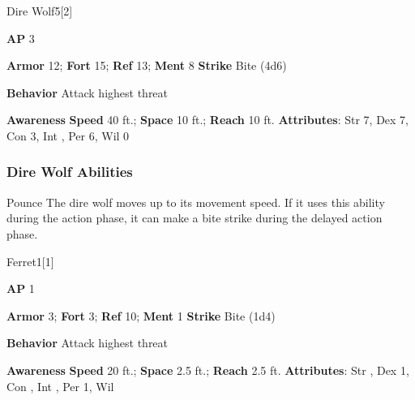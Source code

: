 \begin{monsection}{Dire Wolf}{5}[2]
\vspace{-1em}\vspace{-1em}
\begin{spellcontent}
\begin{spelltargetinginfo}
{\textbf{AP} 3}

\pari \textbf{Armor} 12;
\textbf{Fort} 15;
\textbf{Ref} 13;
\textbf{Ment} 8
\pari \textbf{Strike} Bite  (4d6)



\pari \textbf{Behavior} Attack highest threat
\end{spelltargetinginfo}
\end{spellcontent}

\begin{monsterfooter}
\pari \textbf{Awareness} 
\pari \textbf{Speed} 40 ft.;
\textbf{Space} 10 ft.;
\textbf{Reach} 10 ft.
\pari \textbf{Attributes}:
Str 7,
Dex 7,
Con 3,
Int ,
Per 6,
Wil 0
\end{monsterfooter}
\end{monsection}


\subsubsection{Dire Wolf Abilities}

\begin{ability}{Pounce}
The dire wolf moves up to its movement speed.
If it uses this ability during the action phase, it can make a bite strike during the delayed action phase.
\end{ability}

\begin{monsection}{Ferret}{1}[1]
\vspace{-1em}\vspace{-1em}
\begin{spellcontent}
\begin{spelltargetinginfo}
{\textbf{AP} 1}

\pari \textbf{Armor} 3;
\textbf{Fort} 3;
\textbf{Ref} 10;
\textbf{Ment} 1
\pari \textbf{Strike} Bite  (1d4)



\pari \textbf{Behavior} Attack highest threat
\end{spelltargetinginfo}
\end{spellcontent}

\begin{monsterfooter}
\pari \textbf{Awareness} 
\pari \textbf{Speed} 20 ft.;
\textbf{Space} 2.5 ft.;
\textbf{Reach} 2.5 ft.
\pari \textbf{Attributes}:
Str ,
Dex 1,
Con ,
Int ,
Per 1,
Wil 
\end{monsterfooter}
\end{monsection}


